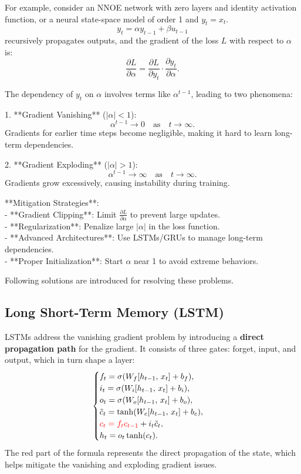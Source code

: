 \begin{example}
For example, consider an NNOE network with zero layers and identity activation function, or a neural state-space model of order 1 and $y_t = x_t$.  
\[
y_t = \alpha y_{t-1} + \beta u_{t-1}
\]  
recursively propagates outputs, and the gradient of the loss \(L\) with respect to \(\alpha\) is:  
\[
\frac{\partial L}{\partial \alpha} = \frac{\partial L}{\partial y_t} \cdot \frac{\partial y_t}{\partial \alpha}.
\]

The dependency of \(y_t\) on \(\alpha\) involves terms like \(\alpha^{t-1}\), leading to two phenomena:

1. **Gradient Vanishing** (\(|\alpha| < 1\)):  
   \[
   \alpha^{t-1} \to 0 \quad \text{as} \quad t \to \infty.
   \]
   Gradients for earlier time steps become negligible, making it hard to learn long-term dependencies.

2. **Gradient Exploding** (\(|\alpha| > 1\)):  
   \[
   \alpha^{t-1} \to \infty \quad \text{as} \quad t \to \infty.
   \]
   Gradients grow excessively, causing instability during training.
\end{example}
\begin{example}
**Mitigation Strategies**:  \\
- **Gradient Clipping**: Limit \(\frac{\partial L}{\partial \alpha}\) to prevent large updates.  \\
- **Regularization**: Penalize large \(|\alpha|\) in the loss function.\\  
- **Advanced Architectures**: Use LSTMs/GRUs to manage long-term dependencies.\\  
- **Proper Initialization**: Start \(\alpha\) near 1 to avoid extreme behaviors.  
\end{example}
Following solutions are introduced for resolving these problems.

\subsection{Long Short-Term Memory (LSTM)}
LSTMs address the vanishing gradient problem by introducing a \textbf{direct propagation path} for the gradient. It consists of three gates: forget, input, and output, which in turn shape a layer:
\[
\begin{cases}
f_t = \sigma(W_f[h_{t-1},\,x_t] + b_f), \\
i_t = \sigma(W_i[h_{t-1},\,x_t] + b_i), \\
o_t = \sigma(W_o[h_{t-1},\,x_t] + b_o), \\
\tilde{c}_t = \tanh(W_c[h_{t-1},\,x_t] + b_c), \\
\textcolor{red}{c_t = f_t c_{t-1}} + i_t \tilde{c}_t, \\
h_t = o_t \tanh(c_t).
\end{cases}
\]
The red part of the formula represents the direct propagation of the state, which helps mitigate the vanishing and exploding gradient issues.

